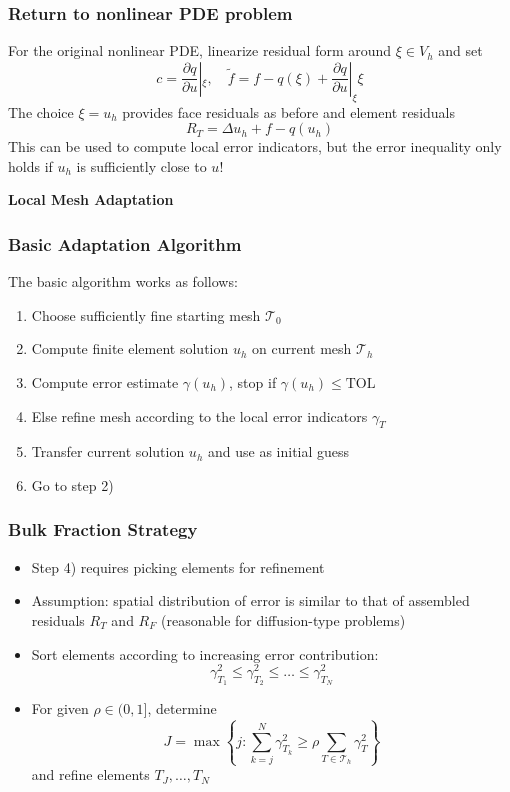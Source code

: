 \documentclass[ignorenonframetext,11pt]{beamer}
\theoremstyle{definition}
\begin{document}
\begin{frame}
\frametitle{Return to nonlinear PDE problem}
For the original nonlinear PDE, linearize residual form around $\xi \in V_h$ and set
\begin{equation*}
  c = \frac{\partial q}{\partial u} |_\xi, \quad \tilde{f} = f - q(\xi) + \frac{\partial q}{\partial u} |_\xi \xi
\end{equation*}
The choice $\xi = u_h$ provides face residuals as before and element residuals
\begin{equation*}
  R_T = \Delta u_h + f - q(u_h)
\end{equation*}
This can be used to compute local error indicators, but the error inequality only
holds if $u_h$ is sufficiently close to $u$!
\end{frame}

\begin{frame}
\begin{center}
\Large\textbf{Local Mesh Adaptation}
\end{center}
\end{frame}

\begin{frame}
\frametitle{Basic Adaptation Algorithm}
The basic algorithm works as follows:
\begin{enumerate}
  \item Choose sufficiently fine starting mesh $\mathcal{T}_0$
  \item Compute finite element solution $u_h$ on current mesh $\mathcal{T}_h$
  \item Compute error estimate $\gamma(u_h)$, stop if $\gamma(u_h) \leq \text{TOL}$
  \item Else refine mesh according to the local error indicators $\gamma_T$
  \item Transfer current solution $u_h$ and use as initial guess
  \item Go to step 2)
\end{enumerate}
\end{frame}

\begin{frame}
\frametitle{Bulk Fraction Strategy}
\begin{itemize}
  \item Step 4) requires picking elements for refinement
  \item Assumption: spatial distribution of error is similar to that of
    assembled residuals $R_T$ and $R_F$ (reasonable for diffusion-type
    problems)
  \item Sort elements according to increasing error contribution:
    \begin{equation*}
      \gamma_{T_1}^2 \leq \gamma_{T_2}^2 \leq \dots \leq \gamma_{T_N}^2
    \end{equation*}
  \item For given $\rho \in (0,1]$, determine
    \begin{equation*}
      J = \max \left\{ j \colon \sum_{k=j}^N \gamma_{T_k}^2 \geq \rho \sum_{T \in \mathcal{T}_h} \gamma_T^2 \right\}
    \end{equation*}
    and refine elements $T_J,\dots,T_N$
\end{itemize}
\end{frame}
\end{document}
